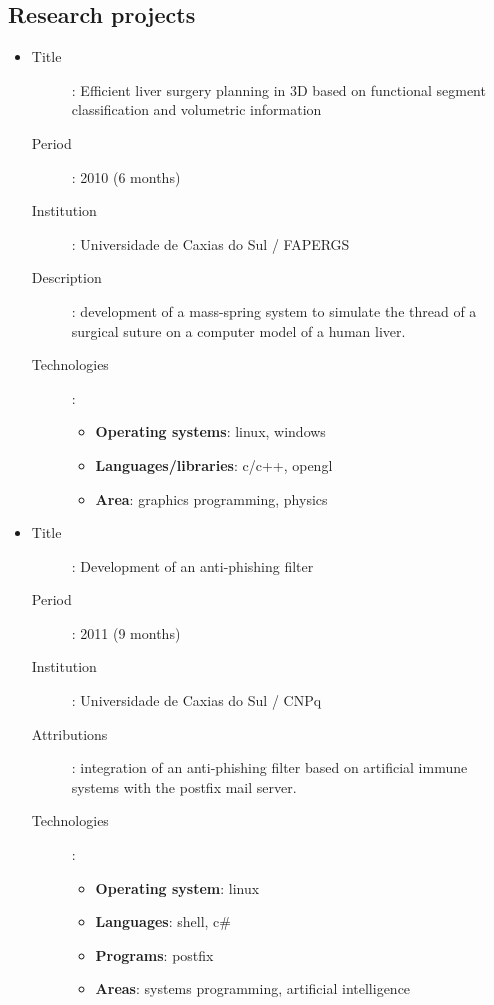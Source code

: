 \subsection*{Research projects}

\begin{itemize}
    \item
        \begin{description}
            \item[Title]:
                Efficient liver surgery planning in 3D based on functional
                segment classification and volumetric information
            \item[Period]: 2010 (6 months)
            \item[Institution]: Universidade de Caxias do Sul / FAPERGS
            \item[Description]:
                development of a mass-spring system to simulate the thread of a
                surgical suture on a computer model of a human liver.
            \item[Technologies]:
                \begin{itemize}
                    \item \textbf{Operating systems}: linux, windows
                    \item \textbf{Languages/libraries}: c/c++, opengl
                    \item \textbf{Area}: graphics programming, physics
                \end{itemize}
        \end{description}
    \item
    \begin{description}
        \item[Title]: Development of an anti-phishing filter
        \item[Period]: 2011 (9 months)
        \item[Institution]: Universidade de Caxias do Sul / CNPq
        \item[Attributions]:
            integration of an anti-phishing filter based on artificial immune
            systems with the postfix mail server.
        \item[Technologies]:
            \begin{itemize}
                \item \textbf{Operating system}: linux
                \item \textbf{Languages}: shell, c\#
                \item \textbf{Programs}: postfix
                \item \textbf{Areas}:
                    systems programming, artificial intelligence
            \end{itemize}
    \end{description}
\end{itemize}

